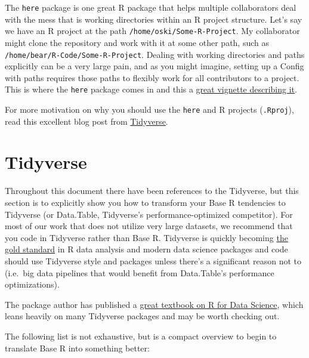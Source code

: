 \documentclass[]{book}
\begin{document}
The \texttt{here} package is one great R package that helps multiple collaborators deal with the mess that is working directories within an R project structure. Let's say we have an R project at the path \texttt{/home/oski/Some-R-Project}. My collaborator might clone the repository and work with it at some other path, such as \texttt{/home/bear/R-Code/Some-R-Project}. Dealing with working directories and paths explicitly can be a very large pain, and as you might imagine, setting up a Config with paths requires those paths to flexibly work for all contributors to a project. This is where the \texttt{here} package comes in and this a \href{https://github.com/jennybc/here_here}{great vignette describing it}.

For more motivation on why you should use the \texttt{here} and R projects (\texttt{.Rproj}), read this excellent blog post from \href{https://www.tidyverse.org/articles/2017/12/workflow-vs-script/}{Tidyverse}.

\hypertarget{tidyverse}{%
\section{Tidyverse}\label{tidyverse}}

Throughout this document there have been references to the Tidyverse, but this section is to explicitly show you how to transform your Base R tendencies to Tidyverse (or Data.Table, Tidyverse's performance-optimized competitor). For most of our work that does not utilize very large datasets, we recommend that you code in Tidyverse rather than Base R. Tidyverse is quickly becoming \href{https://rviews.rstudio.com/2017/06/08/what-is-the-tidyverse/}{the gold standard} in R data analysis and modern data science packages and code should use Tidyverse style and packages unless there's a significant reason not to (i.e.~big data pipelines that would benefit from Data.Table's performance optimizations).

The package author has published a \href{https://r4ds.had.co.nz/}{great textbook on R for Data Science}, which leans heavily on many Tidyverse packages and may be worth checking out.

The following list is not exhaustive, but is a compact overview to begin to translate Base R into something better:
\end{document}
